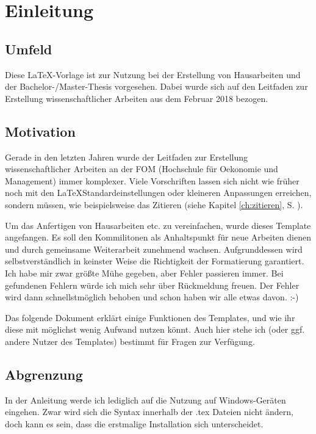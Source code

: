\chapter{Einleitung}
\label{ch:einleitung}

\section{Umfeld}
Diese \LaTeX -Vorlage ist zur Nutzung bei der Erstellung von Hausarbeiten und der Bachelor-/Master-Thesis vorgesehen. Dabei wurde sich auf den Leitfaden zur Erstellung wissenschaftlicher Arbeiten aus dem Februar 2018 bezogen.\autocite{leitfaden}

\section{Motivation}
Gerade in den letzten Jahren wurde der Leitfaden zur Erstellung wissenschaftlicher Arbeiten an der FOM (Hochschule für Oekonomie und Management) immer komplexer. Viele Vorschriften lassen sich nicht wie früher noch mit den \LaTeX\-Standardeinstellungen oder kleineren Anpassungen erreichen, sondern müssen, wie beispielsweise das Zitieren (siehe Kapitel \ref{ch:zitieren}, S. \pageref{ch:zitieren}).

Um das Anfertigen von Hausarbeiten etc. zu vereinfachen, wurde dieses Template angefangen. Es soll den Kommilitonen als Anhaltspunkt für neue Arbeiten dienen und durch gemeinsame Weiterarbeit zunehmend wachsen. Aufgrunddessen wird selbstverständlich in keinster Weise die Richtigkeit der Formatierung garantiert. Ich habe mir zwar größte Mühe gegeben, aber Fehler passieren immer. Bei gefundenen Fehlern würde ich mich sehr über Rückmeldung freuen. Der Fehler wird dann schnellstmöglich behoben und schon haben wir alle etwas davon. :-)

Das folgende Dokument erklärt einige Funktionen des Templates, und wie ihr diese mit möglichst wenig Aufwand nutzen könnt. Auch hier stehe ich (oder ggf. andere Nutzer des Templates) bestimmt für Fragen zur Verfügung.

\section{Abgrenzung}
In der Anleitung werde ich lediglich auf die Nutzung auf Windows-Geräten eingehen. Zwar wird sich die Syntax innerhalb der .tex Dateien nicht ändern, doch kann es sein, dass die erstmalige Installation sich unterscheidet.